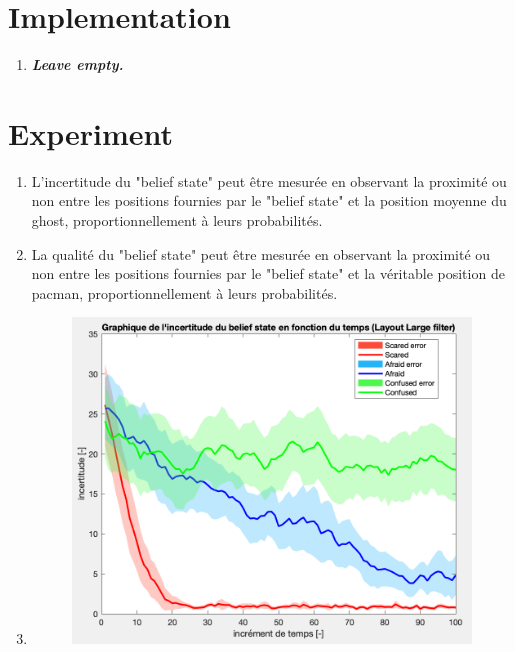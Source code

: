 \documentclass{article}
\begin{document}
\section{Implementation}

\begin{enumerate}[label=\alph*.,leftmargin=*]
    \item \textbf{\textit{Leave empty.}}
\end{enumerate}

\section{Experiment}

\begin{enumerate}[label=\alph*.,leftmargin=*]
    \item L'incertitude du "belief state" peut être mesurée en observant la proximité ou non entre les positions fournies par le "belief state" et la position moyenne du ghost, proportionnellement à leurs probabilités.
    \item La qualité du "belief state" peut être mesurée en observant la proximité ou non entre les positions fournies par le "belief state" et la véritable position de pacman, proportionnellement à leurs probabilités.
    \item \newpage
    \begin{figure}[h!]
        \centering
        \includegraphics[scale=0.75]{i.png}
    \end{figure}
    \begin{figure}[h!]

\end{figure}
\end{enumerate}
\end{document}
